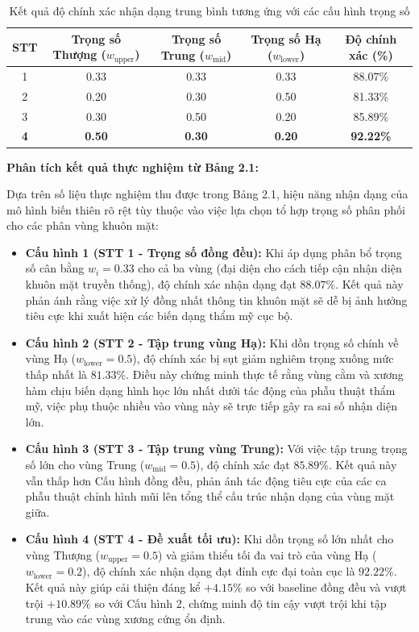 \begin{table}[H]
\centering
\caption{Kết quả độ chính xác nhận dạng trung bình tương ứng với các cấu hình trọng số}
\label{tab:grid_search_results}
\begin{tabularx}{\textwidth}{|C{0.3}|C{1.1}|C{1.1}|C{1.1}|C{1.4}|}
\hline
\textbf{STT} & \textbf{Trọng số Thượng ($w_{\text{upper}}$)} & \textbf{Trọng số Trung ($w_{\text{mid}}$)} & \textbf{Trọng số Hạ ($w_{\text{lower}}$)} & \textbf{Độ chính xác (\%)} \\  & 0.33 & 0.33 & 0.33 & 88.07\% \\  & 0.20 & 0.30 & 0.50 & 81.33\% \\  & 0.30 & 0.50 & 0.20 & 85.89\% \\ \hline
\textbf{4} & \textbf{0.50} & \textbf{0.30} & \textbf{0.20} & \textbf{92.22\%} \\ \hline
\end{tabularx}
\end{table}

\noindent \textbf{Phân tích kết quả thực nghiệm từ Bảng 2.1:}

Dựa trên số liệu thực nghiệm thu được trong Bảng 2.1, hiệu năng nhận dạng của mô hình biến thiên rõ rệt tùy thuộc vào việc lựa chọn tổ hợp trọng số phân phối cho các phân vùng khuôn mặt:
\begin{itemize}
    \item \textbf{Cấu hình 1 (STT 1 - Trọng số đồng đều):} Khi áp dụng phân bổ trọng số cân bằng $w_i = 0.33$ cho cả ba vùng (đại diện cho cách tiếp cận nhận diện khuôn mặt truyền thống), độ chính xác nhận dạng đạt $88.07\%$. Kết quả này phản ánh rằng việc xử lý đồng nhất thông tin khuôn mặt sẽ dễ bị ảnh hưởng tiêu cực khi xuất hiện các biến dạng thẩm mỹ cục bộ.
    
    \item \textbf{Cấu hình 2 (STT 2 - Tập trung vùng Hạ):} Khi dồn trọng số chính về vùng Hạ ($w_{\text{lower}} = 0.5$), độ chính xác bị sụt giảm nghiêm trọng xuống mức thấp nhất là $81.33\%$. Điều này chứng minh thực tế rằng vùng cằm và xương hàm chịu biến dạng hình học lớn nhất dưới tác động của phẫu thuật thẩm mỹ, việc phụ thuộc nhiều vào vùng này sẽ trực tiếp gây ra sai số nhận diện lớn.
    
    \item \textbf{Cấu hình 3 (STT 3 - Tập trung vùng Trung):} Với việc tập trung trọng số lớn cho vùng Trung ($w_{\text{mid}} = 0.5$), độ chính xác đạt $85.89\%$. Kết quả này vẫn thấp hơn Cấu hình đồng đều, phản ánh tác động tiêu cực của các ca phẫu thuật chỉnh hình mũi lên tổng thể cấu trúc nhận dạng của vùng mặt giữa.
    
    \item \textbf{Cấu hình 4 (STT 4 - Đề xuất tối ưu):} Khi dồn trọng số lớn nhất cho vùng Thượng ($w_{\text{upper}} = 0.5$) và giảm thiểu tối đa vai trò của vùng Hạ ($w_{\text{lower}} = 0.2$), độ chính xác nhận dạng đạt đỉnh cực đại toàn cục là $92.22\%$. Kết quả này giúp cải thiện đáng kể $+4.15\%$ so với baseline đồng đều và vượt trội $+10.89\%$ so với Cấu hình 2, chứng minh độ tin cậy vượt trội khi tập trung vào các vùng xương cứng ổn định.
\end{itemize}

